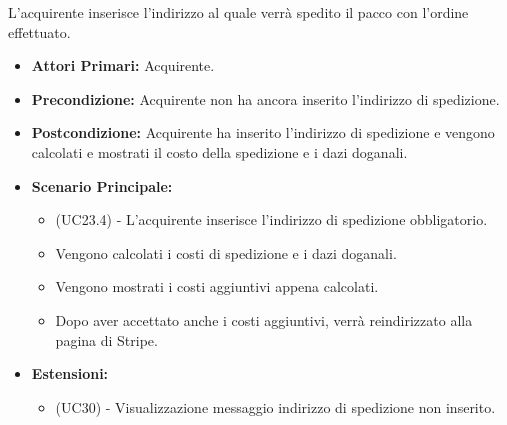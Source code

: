 L'acquirente inserisce l'indirizzo al quale verrà spedito il pacco con l'ordine effettuato.
\begin{itemize}
    \item \textbf{Attori Primari:} Acquirente.
    \item \textbf{Precondizione:} Acquirente non ha ancora inserito l'indirizzo di spedizione.
    \item \textbf{Postcondizione:} Acquirente ha inserito l'indirizzo di spedizione e vengono calcolati e mostrati il costo della spedizione e i dazi doganali.
    \item \textbf{Scenario Principale:}
    \begin{itemize}
        \item (UC23.4) - L'acquirente inserisce l'indirizzo di spedizione obbligatorio.
        \item Vengono calcolati i costi di spedizione e i dazi doganali.
        \item Vengono mostrati i costi aggiuntivi appena calcolati.
        \item Dopo aver accettato anche i costi aggiuntivi, verrà reindirizzato alla pagina di Stripe.
    \end{itemize}
    \item \textbf{Estensioni:}
    \begin{itemize}
        \item (UC30) - Visualizzazione messaggio indirizzo di spedizione non inserito.
    \end{itemize}
\end{itemize}

